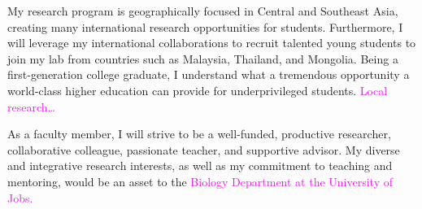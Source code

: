 \documentclass[letterpaper, 10pt]{letter}
\newcommand{\highlight}[1]{\textcolor{magenta}{#1}}
\begin{document}
\begin{letter}


My research program is geographically focused in Central and Southeast Asia,
creating many international research opportunities for students.
Furthermore, I will leverage my international collaborations to recruit
talented young students to join my lab from countries such as Malaysia,
Thailand, and Mongolia.
Being a first-generation college graduate, I understand what a tremendous
opportunity a world-class higher education can provide for underprivileged
students.
\highlight{
    Local research\ldots
}


As a faculty member, I will strive to be a well-funded, productive researcher,
collaborative colleague, passionate teacher, and supportive advisor.
My diverse and integrative research interests, as well as my commitment to
teaching and mentoring, would be an asset to the
\highlight{
Biology Department
at
the University of Jobs.
}


\end{letter}
\end{document}
